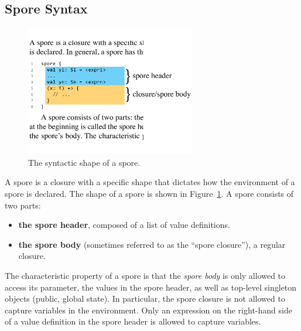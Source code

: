 \documentclass[runningheads]{llncs}
\begin{document}
\begin{sloppypar}
\pagebreak
\subsection{Spore Syntax}
\label{sec:spore-syntax}

\setlength{\belowcaptionskip}{-6pt}
\begin{figure}[t!]
\centering
\includegraphics[width=7.4cm]{spore-shape.pdf}
\caption{The syntactic shape of a spore.}
\label{fig:spore-shape}
\vspace{-5mm}
\end{figure}
\setlength{\belowcaptionskip}{0pt}

A spore is a closure with a specific shape that dictates how the environment
of a spore is declared. The shape of a spore is shown in Figure~\ref{fig:spore-shape}.
A spore consists of two parts:
\begin{itemize}
\item {\bf the spore header}, composed of a list of value definitions.
\item {\bf the spore body} (sometimes referred to as the ``spore closure''), a regular closure.
\end{itemize}


The characteristic property
of a spore is that the {\em spore body} is only allowed to access its
parameter, the values in the spore header, as well as top-level singleton objects
(public, global state). In particular, the spore closure is not allowed to
capture variables in the environment. Only an expression on the right-hand
side of a value definition in the spore header is allowed to capture
variables.


\end{sloppypar}
\end{document}
